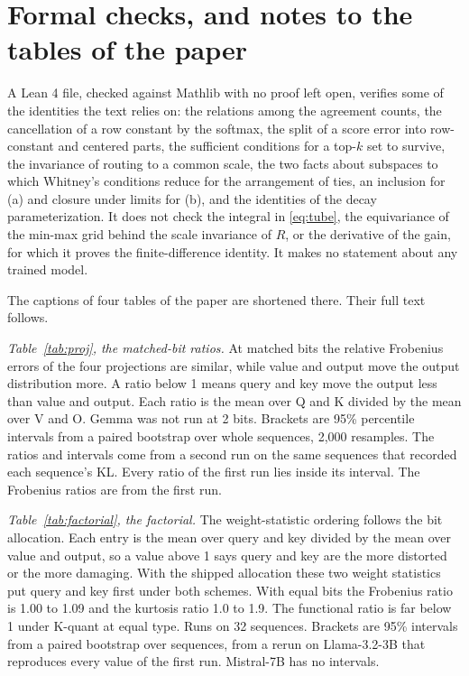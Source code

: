 \documentclass[journal,onecolumn]{IEEEtran}
\begin{document}
\section{Formal checks, and notes to the tables of the paper}\label{supp:checks}

A Lean 4 file, checked against Mathlib with no proof left open, verifies some of the identities
the text relies on: the relations among the agreement counts, the cancellation of a row constant by
the softmax, the split of a score error into row-constant and centered parts, the sufficient
conditions for a top-$k$ set to survive, the invariance of routing to a common scale, the two
facts about subspaces to which Whitney's conditions reduce for the arrangement of ties, an
inclusion for (a) and closure under limits for (b), and the
identities of the decay parameterization. It does not check the integral in
\eqref{eq:tube}, the equivariance of the min-max grid behind the scale invariance of $R$, or the
derivative of the gain, for which it proves the finite-difference identity. It makes no statement about any trained model.

The captions of four tables of the paper are shortened there. Their full text follows.

\emph{Table~\ref{tab:proj}, the matched-bit ratios.} At matched bits the relative Frobenius errors of the four projections are similar, while value and output move the output distribution more. A ratio below 1 means query and key move the output less than value and output. Each ratio is the mean over Q and K divided by the mean over V and O. Gemma was not run at 2 bits. Brackets are 95\% percentile intervals from a paired bootstrap over whole sequences, 2{,}000 resamples. The ratios and intervals come from a second run on the same sequences that recorded each sequence's KL. Every ratio of the first run lies inside its interval. The Frobenius ratios are from the first run.

\emph{Table~\ref{tab:factorial}, the factorial.} The weight-statistic ordering follows the bit allocation. Each entry is the mean over query and key divided by the mean over value and output, so a value above 1 says query and key are the more distorted or the more damaging. With the shipped allocation these two weight statistics put query and key first under both schemes. With equal bits the Frobenius ratio is 1.00 to 1.09 and the kurtosis ratio 1.0 to 1.9. The functional ratio is far below 1 under K-quant at equal type. Runs on 32 sequences. Brackets are 95\% intervals from a paired bootstrap over sequences, from a rerun on Llama-3.2-3B that reproduces every value of the first run. Mistral-7B has no intervals.
\end{document}
